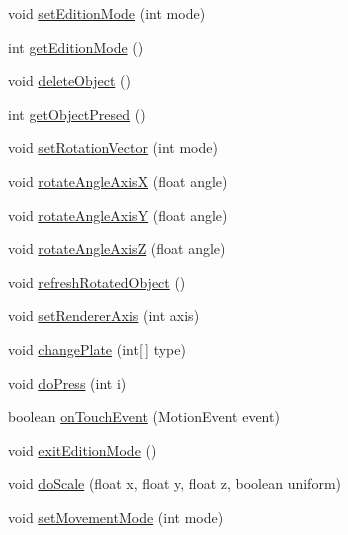 \begin{DoxyCompactItemize}
\item 
void \hyperlink{classandroid_1_1app_1_1printerapp_1_1viewer_1_1_viewer_surface_view_a6d9d3a4f37f1efeb300471f456f1b00e}{set\+Edition\+Mode} (int mode)
\item 
int \hyperlink{classandroid_1_1app_1_1printerapp_1_1viewer_1_1_viewer_surface_view_af3aeca304d1dcc8a6c209e61656162b7}{get\+Edition\+Mode} ()
\item 
void \hyperlink{classandroid_1_1app_1_1printerapp_1_1viewer_1_1_viewer_surface_view_a50043b0c229e55da0bda877352a7c5cc}{delete\+Object} ()
\item 
int \hyperlink{classandroid_1_1app_1_1printerapp_1_1viewer_1_1_viewer_surface_view_a9410d7435c0e4cf5f2c75619e854fd2f}{get\+Object\+Presed} ()
\item 
void \hyperlink{classandroid_1_1app_1_1printerapp_1_1viewer_1_1_viewer_surface_view_a7943468ba79edefa6e314a3475a7ba27}{set\+Rotation\+Vector} (int mode)
\item 
void \hyperlink{classandroid_1_1app_1_1printerapp_1_1viewer_1_1_viewer_surface_view_a43b2690a532e8937cdb33bcd1f78cef0}{rotate\+Angle\+AxisX} (float angle)
\item 
void \hyperlink{classandroid_1_1app_1_1printerapp_1_1viewer_1_1_viewer_surface_view_a5199fc791b0b63aeddb575d82ace0aba}{rotate\+Angle\+AxisY} (float angle)
\item 
void \hyperlink{classandroid_1_1app_1_1printerapp_1_1viewer_1_1_viewer_surface_view_a83f6a92143864a77839709b192965568}{rotate\+Angle\+AxisZ} (float angle)
\item 
void \hyperlink{classandroid_1_1app_1_1printerapp_1_1viewer_1_1_viewer_surface_view_a2caef39d36fdb5c4dcefa78fc28cfce4}{refresh\+Rotated\+Object} ()
\item 
void \hyperlink{classandroid_1_1app_1_1printerapp_1_1viewer_1_1_viewer_surface_view_afb5a96a8b4d05864e8e26dee5e50a898}{set\+Renderer\+Axis} (int axis)
\item 
void \hyperlink{classandroid_1_1app_1_1printerapp_1_1viewer_1_1_viewer_surface_view_a52857e81ca974fef355ebeb49fbb41a4}{change\+Plate} (int\mbox{[}$\,$\mbox{]} type)
\item 
void \hyperlink{classandroid_1_1app_1_1printerapp_1_1viewer_1_1_viewer_surface_view_aaa611a131c1f3766974c85381234d11a}{do\+Press} (int i)
\item 
boolean \hyperlink{classandroid_1_1app_1_1printerapp_1_1viewer_1_1_viewer_surface_view_aa8ecab9253b4af1faa6ea43719f4215e}{on\+Touch\+Event} (Motion\+Event event)
\item 
void \hyperlink{classandroid_1_1app_1_1printerapp_1_1viewer_1_1_viewer_surface_view_aaa5bb004b8d1829086fd241c87b1ec29}{exit\+Edition\+Mode} ()
\item 
void \hyperlink{classandroid_1_1app_1_1printerapp_1_1viewer_1_1_viewer_surface_view_a05c5b6dafd4c4a213f762c43c05c2bcf}{do\+Scale} (float x, float y, float z, boolean uniform)
\item 
void \hyperlink{classandroid_1_1app_1_1printerapp_1_1viewer_1_1_viewer_surface_view_af24c4ca2ed9ced163323ab966d6c7428}{set\+Movement\+Mode} (int mode)
\end{DoxyCompactItemize}
